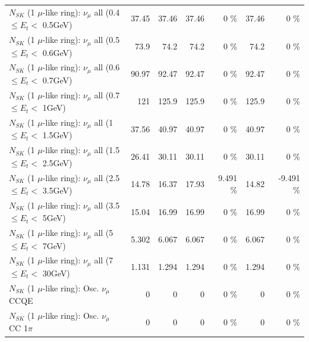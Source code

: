 \begin{table}
\begin{tabular}{| l | r | r | r  r | r  r |}
       $N_{SK}$ (1 $\mu$-like ring): $\nu_{\mu}$ all (0.4 $\leq E_{t} <$ 0.5GeV) &           37.45 &           37.46 &           37.46 &        0 \%  &           37.46 &        0 \%  \\ 
       $N_{SK}$ (1 $\mu$-like ring): $\nu_{\mu}$ all (0.5 $\leq E_{t} <$ 0.6GeV) &            73.9 &            74.2 &            74.2 &        0 \%  &            74.2 &        0 \%  \\ 
       $N_{SK}$ (1 $\mu$-like ring): $\nu_{\mu}$ all (0.6 $\leq E_{t} <$ 0.7GeV) &           90.97 &           92.47 &           92.47 &        0 \%  &           92.47 &        0 \%  \\ 
         $N_{SK}$ (1 $\mu$-like ring): $\nu_{\mu}$ all (0.7 $\leq E_{t} <$ 1GeV) &             121 &           125.9 &           125.9 &        0 \%  &           125.9 &        0 \%  \\ 
         $N_{SK}$ (1 $\mu$-like ring): $\nu_{\mu}$ all (1 $\leq E_{t} <$ 1.5GeV) &           37.56 &           40.97 &           40.97 &        0 \%  &           40.97 &        0 \%  \\ 
       $N_{SK}$ (1 $\mu$-like ring): $\nu_{\mu}$ all (1.5 $\leq E_{t} <$ 2.5GeV) &           26.41 &           30.11 &           30.11 &        0 \%  &           30.11 &        0 \%  \\ 
       $N_{SK}$ (1 $\mu$-like ring): $\nu_{\mu}$ all (2.5 $\leq E_{t} <$ 3.5GeV) &           14.78 &           16.37 &           17.93 &    9.491 \%  &           14.82 &   -9.491 \%  \\ 
         $N_{SK}$ (1 $\mu$-like ring): $\nu_{\mu}$ all (3.5 $\leq E_{t} <$ 5GeV) &           15.04 &           16.99 &           16.99 &        0 \%  &           16.99 &        0 \%  \\ 
           $N_{SK}$ (1 $\mu$-like ring): $\nu_{\mu}$ all (5 $\leq E_{t} <$ 7GeV) &           5.302 &           6.067 &           6.067 &        0 \%  &           6.067 &        0 \%  \\ 
          $N_{SK}$ (1 $\mu$-like ring): $\nu_{\mu}$ all (7 $\leq E_{t} <$ 30GeV) &           1.131 &           1.294 &           1.294 &        0 \%  &           1.294 &        0 \%  \\ 
\hline
\hline
                               $N_{SK}$ (1 $\mu$-like ring): Osc. $\nu_\mu$ CCQE &               0 &               0 &               0 &        0 \%  &               0 &        0 \%  \\ 
                          $N_{SK}$ (1 $\mu$-like ring): Osc. $\nu_\mu$ CC 1$\pi$ &               0 &               0 &               0 &        0 \%  &               0 &        0 \%  \\ 

\end{tabular}
\end{table}

